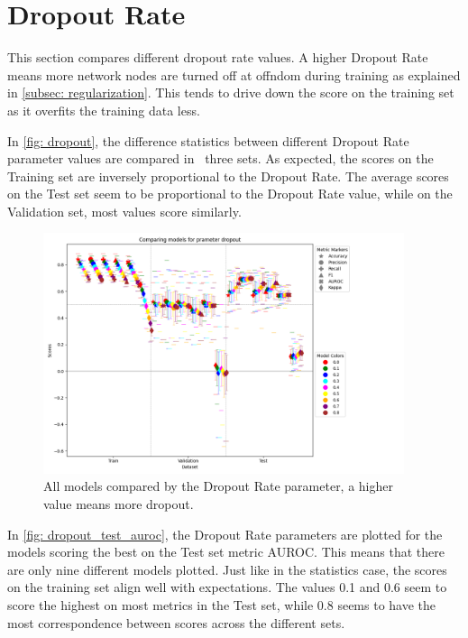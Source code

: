 \section{Dropout Rate}
This section compares different dropout rate values. A higher Dropout Rate means more network nodes are turned off at offndom during training as explained in \autoref{subsec: regularization}. This tends to drive down the score on the training set as it overfits the training data less.

In \autoref{fig: dropout}, the difference statistics between different Dropout Rate parameter values are compared in \ three sets. As expected, the scores on the Training set are inversely proportional to the Dropout Rate. The average scores on the Test set seem to be proportional to the Dropout Rate value, while on the Validation set, most values score similarly. 

\begin{figure}[H]
    \centering
    \includegraphics[width=400px]{Figures/results/dropout/dropout.png}
    \caption{All models compared by the Dropout Rate parameter, a higher value means more dropout.}
    \label{fig: dropout}
\end{figure}

In \autoref{fig: dropout_test_auroc}, the Dropout Rate parameters are plotted for the models scoring the best on the Test set metric AUROC. This means that there are only nine different models plotted. Just like in the statistics case, the scores on the training set align well with expectations. The values 0.1 and 0.6 seem to score the highest on most metrics in the Test set, while 0.8 seems to have the most correspondence between scores across the different sets.


